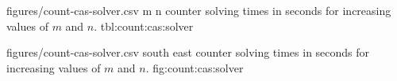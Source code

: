 \vfill

\SolverStatsTable
  {figures/count-cas-solver.csv}
  {m n}
  {\CountRowHeader}
  { counter solving times in seconds for increasing values of $m$ and $n$.}
  {tbl:count:cas:solver}

\SolverStatsGraph
  {figures/count-cas-solver.csv}
  {south east}
  { counter solving times in seconds for increasing values of $m$ and $n$.}
  {fig:count:cas:solver}
